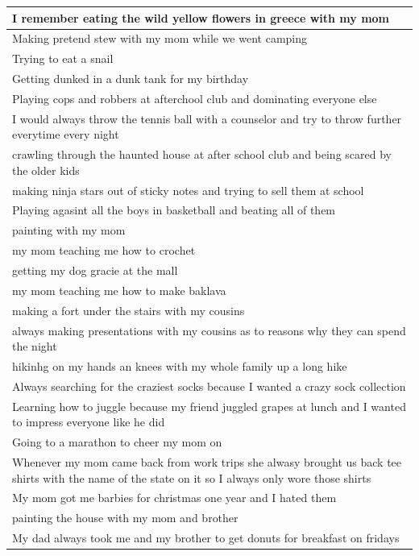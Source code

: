 \documentclass[
  .7em,
  letterpaper,
  DIV=11,
  numbers=noendperiod]{scrartcl}
\begin{document}
\begin{table}
\begin{tabular}{l}
\hline
I remember eating the wild yellow flowers in greece with my mom\\
\hline
Making pretend stew with my mom while we went camping\\
\hline
Trying to eat a snail\\
\hline
Getting dunked in a dunk tank for my birthday\\
\hline
Playing cops and robbers at afterchool club and dominating everyone else\\
\hline
I would always throw the tennis ball with a counselor and try to throw further everytime every night\\
\hline
crawling through the haunted house at after school club and being scared by the older kids\\
\hline
making ninja stars out of sticky notes and trying to sell them at school\\
\hline
Playing agasint all the boys in basketball and beating all of them\\
\hline
painting with my mom\\
\hline
my mom teaching me how to crochet\\
\hline
getting my dog gracie at the mall\\
\hline
my mom teaching me how to make baklava\\
\hline
making a fort under the stairs with my cousins\\
\hline
always making presentations with my cousins as to reasons why they can spend the night\\
\hline
hikinhg on my hands an knees with my whole family up a long hike\\
\hline
Always searching for the craziest socks because I wanted a crazy sock collection\\
\hline
Learning how to juggle because my friend juggled grapes at lunch and I wanted to impress everyone like he did\\
\hline
Going to a marathon to cheer my mom on\\
\hline
Whenever my mom came back from work trips she alwasy brought us back tee shirts with the name of the state on it so I always only wore those shirts\\
\hline
My mom got me barbies for christmas one year and I hated them\\
\hline
painting the house with my mom and brother\\
\hline
My dad always took me and my brother to get donuts for breakfast on fridays\\

\end{tabular}
\end{table}
\end{document}
